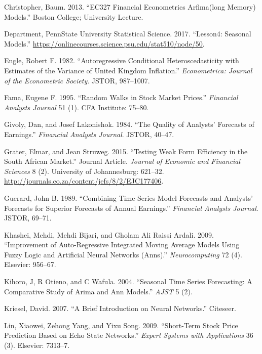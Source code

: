 \documentclass[12pt,preprint, authoryear]{elsarticle}
\numberwithin{equation}{section}
\numberwithin{figure}{section}
\numberwithin{table}{section}
\begin{document}
\hypertarget{ref-Baum}{}
Christopher, Baum. 2013. ``EC327 Financial Econometrics Arfima(long
Memory) Models.'' Boston College; University Lecture.

\hypertarget{ref-PennState2017}{}
Department, PennState University Statistical Science. 2017. ``Lesson4:
Seasonal Models.''
\url{https://onlinecourses.science.psu.edu/stat510/node/50}.

\hypertarget{ref-engle1982autoregressive}{}
Engle, Robert F. 1982. ``Autoregressive Conditional Heteroscedasticity
with Estimates of the Variance of United Kingdom Inflation.''
\emph{Econometrica: Journal of the Econometric Society}. JSTOR,
987--1007.

\hypertarget{ref-fama1995random}{}
Fama, Eugene F. 1995. ``Random Walks in Stock Market Prices.''
\emph{Financial Analysts Journal} 51 (1). CFA Institute: 75--80.

\hypertarget{ref-givoly1984quality}{}
Givoly, Dan, and Josef Lakonishok. 1984. ``The Quality of Analysts'
Forecasts of Earnings.'' \emph{Financial Analysts Journal}. JSTOR,
40--47.

\hypertarget{ref-GraterUOJ}{}
Grater, Elmar, and Jean Struweg. 2015. ``Testing Weak Form Efficiency in
the South African Market.'' Journal Article. \emph{Journal of Economic
and Financial Sciences} 8 (2). University of Johannesburg: 621--32.
\url{http://journals.co.za/content/jefs/8/2/EJC177406}.

\hypertarget{ref-guerard1989combining}{}
Guerard, John B. 1989. ``Combining Time-Series Model Forecasts and
Analysts' Forecasts for Superior Forecasts of Annual Earnings.''
\emph{Financial Analysts Journal}. JSTOR, 69--71.

\hypertarget{ref-khashei2009improvement}{}
Khashei, Mehdi, Mehdi Bijari, and Gholam Ali Raissi Ardali. 2009.
``Improvement of Auto-Regressive Integrated Moving Average Models Using
Fuzzy Logic and Artificial Neural Networks (Anns).''
\emph{Neurocomputing} 72 (4). Elsevier: 956--67.

\hypertarget{ref-kihoro2004seasonal}{}
Kihoro, J, R Otieno, and C Wafula. 2004. ``Seasonal Time Series
Forecasting: A Comparative Study of Arima and Ann Models.'' \emph{AJST}
5 (2).

\hypertarget{ref-kriesel2007brief}{}
Kriesel, David. 2007. ``A Brief Introduction on Neural Networks.''
Citeseer.

\hypertarget{ref-lin2009short}{}
Lin, Xiaowei, Zehong Yang, and Yixu Song. 2009. ``Short-Term Stock Price
Prediction Based on Echo State Networks.'' \emph{Expert Systems with
Applications} 36 (3). Elsevier: 7313--7.
\end{document}
